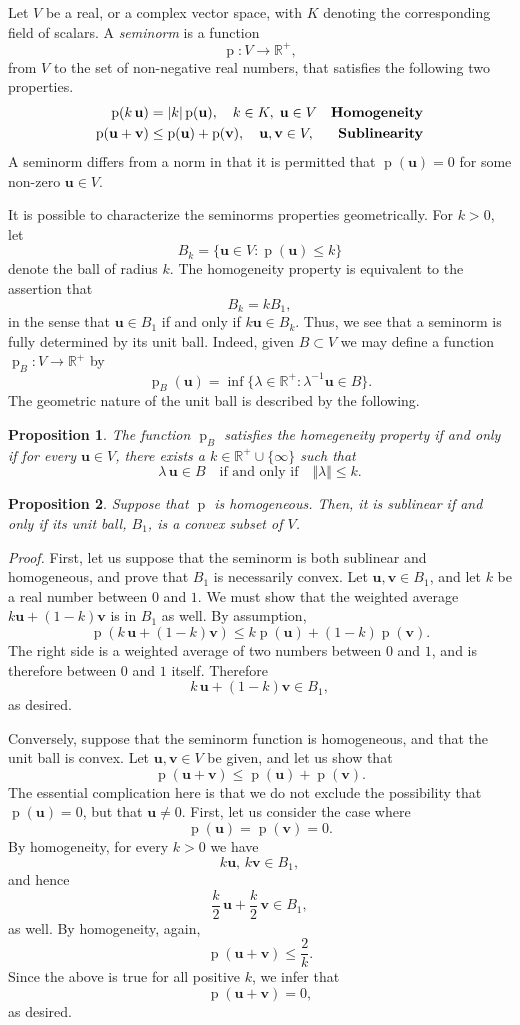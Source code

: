 \documentclass[12pt]{article}
\newcommand{\reals}{\mathbb{R}}
\newtheorem{proposition}{Proposition}
\newcommand{\bu}{\mathbf{u}}
\newcommand{\bv}{\mathbf{v}}
\newcommand{\pnorm}{\operatorname{p}}
\newcommand{\snorm}[1]{\pnorm(#1)}
\begin{document}
Let $V$ be a real, or a complex vector space, with $K$ denoting the
corresponding field of scalars. A \emph{seminorm}  is a function
$$\operatorname{p}:V\to\reals^+,$$
from $V$ to the set of non-negative real numbers, that satisfies the
following two properties.
\begin{align*}
\snorm{k\, \bu} &= \vert k\vert \snorm{\bu},\quad k\in K,\; \bu\in V
& \text{\bf 
Homogeneity}\\
\snorm{\bu+\bv} &\leq \snorm{\bu}+\snorm{\bv},\quad \bu,\bv\in V,
&\text{\bf Sublinearity} 
\end{align*}
A seminorm differs from a norm in that it is permitted that $\snorm{\bu}=0$
for some non-zero $\bu\in V.$

It is possible to characterize the seminorms properties
geometrically. For $k>0$, let
$$B_k = \{ \bu \in V: \snorm{\bu}\leq k\}$$ denote
the ball of radius $k$. The homogeneity property is equivalent to the
assertion that
$$B_k = k B_1,$$
in the sense that
$\bu \in B_1$ if and only if
$k\bu\in B_k.$
Thus, we see that a seminorm is fully determined by its unit ball.
Indeed, given $B\subset V$ we may define a function
$\pnorm_B:V\to \reals^+$
by
$$\pnorm_B(\bu) = \inf\{ \lambda\in\reals^+ : \lambda^{-1}\bu\in B\}.$$
The geometric nature of the unit ball is described by the following.
\begin{proposition}
The function $\pnorm_B$ satisfies the homegeneity property if and only if
for every $\bu\in
V$, there exists a $k\in\reals^+\cup \{\infty\}$ such that
$$\lambda\,\bu \in B\quad\text{if and only if}\quad \Vert \lambda\Vert
\leq k.$$

\end{proposition}
\begin{proposition}
  Suppose that $\pnorm$ is homogeneous. Then, it is sublinear if and
  only if its unit ball, $B_1$, is a convex subset of $V$.
\end{proposition}
\emph{Proof.} First, let us suppose that the seminorm is both sublinear
and homogeneous, and prove that $B_1$ is necessarily convex. Let
$\bu,\bv\in B_1$, and let $k$ be a real number between $0$ and $1$.
We must show that the weighted average $k\bu+(1-k)\bv$ is in $B_1$ as
well. By assumption,
$$\snorm{k\,\bu +(1-k)\bv} \leq k\snorm{\bu} +(1-k)\snorm{\bv}.$$
The right side is a
weighted average of two numbers between $0$ and $1$, and is therefore
between $0$ and $1$ itself. Therefore
$$k\,\bu+(1-k)\bv \in B_1,$$
as desired.

Conversely, suppose that the seminorm function is homogeneous, and
that the unit ball is convex. Let $\bu,\bv\in
V$ be given, and let us show that
$$\snorm{\bu+\bv}\leq \snorm{\bu}+\snorm{\bv}.$$
The essential complication here is that we do not exclude the
possibility that $\snorm{\bu}=0$, but that $\bu\neq 0$.
First, let us consider the case where
$$\snorm{\bu}=\snorm{\bv}=0.$$
By homogeneity, for every $k>0$ we have
$$k\bu,\,k\bv\in B_1,$$
and hence
$$\frac{k}{2}\, \bu + \frac{k}{2}\,\bv\in B_1, $$
as well. By homogeneity, again,
$$\snorm{\bu+\bv}\leq \frac{2}{k}.$$
Since the above is true for all positive $k$, we infer that
$$\snorm{\bu+\bv} = 0,$$
as desired.
\end{document}

